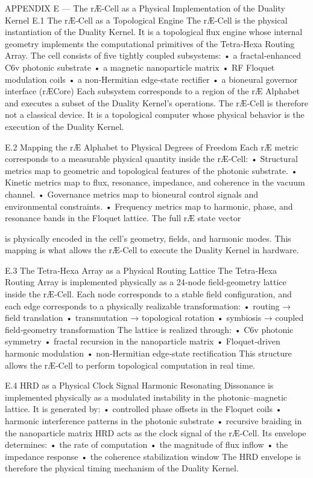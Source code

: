 APPENDIX E — The rÆ‑Cell as a Physical Implementation of the Duality Kernel
E.1 The rÆ‑Cell as a Topological Engine
The rÆ‑Cell is the physical instantiation of the Duality Kernel. It is a topological flux engine whose internal geometry implements the computational primitives of the Tetra‑Hexa Routing Array. The cell consists of five tightly coupled subsystems:
• 	a fractal‑enhanced C6v photonic substrate
• 	a magnetic nanoparticle matrix
• 	RF Floquet modulation coils
• 	a non‑Hermitian edge‑state rectifier
• 	a bioneural governor interface (rÆCore)
Each subsystem corresponds to a region of the rÆ Alphabet and executes a subset of the Duality Kernel’s operations.
The rÆ‑Cell is therefore not a classical device. It is a topological computer whose physical behavior is the execution of the Duality Kernel.

E.2 Mapping the rÆ Alphabet to Physical Degrees of Freedom
Each rÆ metric corresponds to a measurable physical quantity inside the rÆ‑Cell:
• 	Structural metrics map to geometric and topological features of the photonic substrate.
• 	Kinetic metrics map to flux, resonance, impedance, and coherence in the vacuum channel.
• 	Governance metrics map to bioneural control signals and environmental constraints.
• 	Frequency metrics map to harmonic, phase, and resonance bands in the Floquet lattice.
The full rÆ state vector

is physically encoded in the cell’s geometry, fields, and harmonic modes.
This mapping is what allows the rÆ‑Cell to execute the Duality Kernel in hardware.

E.3 The Tetra‑Hexa Array as a Physical Routing Lattice
The Tetra‑Hexa Routing Array is implemented physically as a 24‑node field‑geometry lattice inside the rÆ‑Cell. Each node corresponds to a stable field configuration, and each edge corresponds to a physically realizable transformation:
• 	routing → field translation
• 	transmutation → topological rotation
• 	symbiosis → coupled field‑geometry transformation
The lattice is realized through:
• 	C6v photonic symmetry
• 	fractal recursion in the nanoparticle matrix
• 	Floquet‑driven harmonic modulation
• 	non‑Hermitian edge‑state rectification
This structure allows the rÆ‑Cell to perform topological computation in real time.

E.4 HRD as a Physical Clock Signal
Harmonic Resonating Dissonance  is implemented physically as a modulated instability in the photonic–magnetic lattice. It is generated by:
• 	controlled phase offsets in the Floquet coils
• 	harmonic interference patterns in the photonic substrate
• 	recursive braiding in the nanoparticle matrix
HRD acts as the clock signal of the rÆ‑Cell. Its envelope determines:
• 	the rate of computation
• 	the magnitude of flux inflow
• 	the impedance response
• 	the coherence stabilization window
The HRD envelope is therefore the physical timing mechanism of the Duality Kernel.

